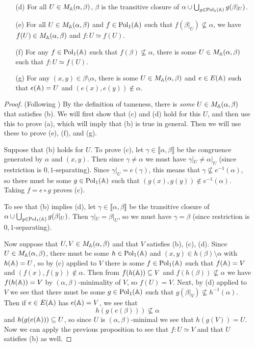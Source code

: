 \begin{appendices}
\begin{thm}
\begin{itemize}
\item[(d)] For all $U \in M_{\mathbb{A}}(\alpha, \beta)$, $\beta$ is the transitive closure of $\alpha \cup \bigcup_{g \in \operatorname{Pol}_1(\mathbb{A})} g(\beta|_U)$.

\item[(e)] For all $U \in M_{\mathbb{A}}(\alpha, \beta)$ and $f \in \operatorname{Pol}_1(\mathbb{A})$ such that $f(\beta|_U) \not\subseteq \alpha$, we have $f(U) \in M_{\mathbb{A}}(\alpha, \beta)$ and $f : U \simeq f(U)$.

\item[(f)] For any $f \in \operatorname{Pol}_1(\mathbb{A})$ such that $f(\beta) \not\subseteq \alpha$, there is some $U \in M_{\mathbb{A}}(\alpha,\beta)$ such that $f : U \simeq f(U)$.

\item[(g)] For any $(x,y) \in \beta\setminus\alpha$, there is some $U \in M_{\mathbb{A}}(\alpha, \beta)$ and $e \in E(\mathbb{A})$ such that $e(\mathbb{A}) = U$ and $(e(x), e(y)) \not\in \alpha$.
\end{itemize}
\end{thm}
\begin{proof} (Following \cite{hobby-mckenzie}) By the definition of tameness, there is \emph{some} $U \in M_{\mathbb{A}}(\alpha, \beta)$ that satisfies (b). We will first show that (c) and (d) hold for this $U$, and then use this to prove (a), which will imply that (b) is true in general. Then we will use these to prove (e), (f), and (g).

Suppose that (b) holds for $U$. To prove (c), let $\gamma \in \llbracket \alpha, \beta \rrbracket$ be the congruence generated by $\alpha$ and $(x,y)$. Then since $\gamma \ne \alpha$ we must have $\gamma|_U \ne \alpha|_U$ (since restriction is $0,1$-separating). Since $\gamma|_U = e(\gamma)$, this means that $\gamma \not\subseteq e^{-1}(\alpha)$, so there must be some $g \in \operatorname{Pol}_1(\mathbb{A})$ such that $(g(x), g(y)) \not\in e^{-1}(\alpha)$. Taking $f = e\circ g$ proves (c).

To see that (b) implies (d), let $\gamma \in \llbracket \alpha, \beta \rrbracket$ be the transitive closure of $\alpha \cup \bigcup_{g \in \operatorname{Pol}_1(\mathbb{A})} g(\beta|_U)$. Then $\gamma|_U = \beta|_U$, so we must have $\gamma = \beta$ (since restriction is $0,1$-separating).

Now suppose that $U,V \in M_{\mathbb{A}}(\alpha, \beta)$ and that $V$ satisfies (b), (c), (d). Since $U \in M_{\mathbb{A}}(\alpha,\beta)$, there must be some $h \in \operatorname{Pol}_1(\mathbb{A})$ and $(x,y) \in h(\beta) \setminus \alpha$ with $h(\mathbb{A}) = U$, so by (c) applied to $V$ there is some $f \in \operatorname{Pol}_1(\mathbb{A})$ such that $f(\mathbb{A}) = V$ and $(f(x), f(y)) \not\in \alpha$. Then from $f(h(\mathbb{A})) \subseteq V$ and $f(h(\beta)) \not\subseteq \alpha$ we have $f(h(\mathbb{A})) = V$ by $(\alpha,\beta)$-minimality of $V$, so $f(U) = V$. Next, by (d) applied to $V$ we see that there must be some $g \in \operatorname{Pol}_1(\mathbb{A})$ such that $g(\beta|_V) \not\subseteq h^{-1}(\alpha)$. Then if $e \in E(\mathbb{A})$ has $e(\mathbb{A}) = V$, we see that
\[
h(g(e(\beta))) \not\subseteq \alpha
\]
and $h(g(e(\mathbb{A}))) \subseteq U$, so since $U$ is $(\alpha,\beta)$-minimal we see that $h(g(V)) = U$. Now we can apply the previous proposition to see that $f : U \simeq V$ and that $U$ satisfies (b) as well.


\end{proof}
\end{appendices}
